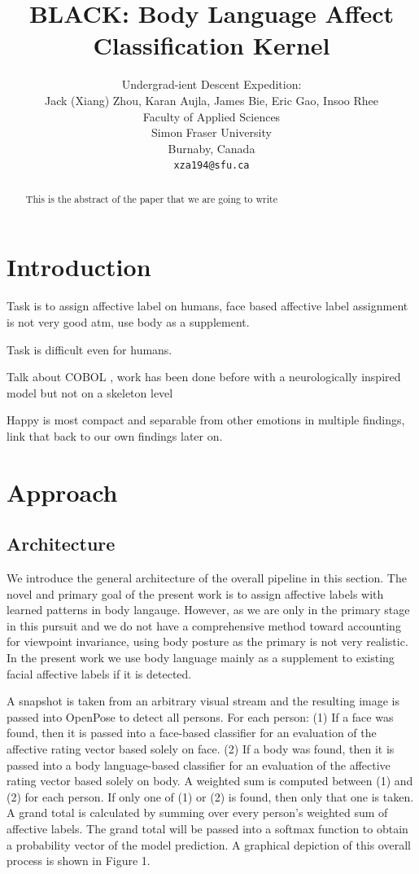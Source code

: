 \documentclass{article}
\title{BLACK: Body Language Affect Classification Kernel}
\author{
  Undergrad-ient Descent Expedition: \\
  Jack (Xiang) Zhou, Karan Aujla, James Bie, Eric Gao, Insoo Rhee\\
  Faculty of Applied Sciences\\
  Simon Fraser University\\
  Burnaby, Canada\\
  \texttt{xza194@sfu.ca} \\
}
\begin{document}
\maketitle

\begin{abstract}
  This is the abstract of the paper that we are going to write
\end{abstract}

\section{Introduction}



Task is to assign affective label on humans, face based affective label assignment is not very good atm, use body as a supplement.

Task is difficult even for humans. 

Talk about COBOL \citep{schindler2008recognizing}, work has been done before with a neurologically inspired model but not on a skeleton level

Happy is most compact and separable from other emotions in multiple findings, link that back to our own findings later on.

\section{Approach}
\subsection{Architecture}

We introduce the general architecture of the overall pipeline in this section. The novel and primary goal of the present work is to assign affective labels with learned patterns in body langauge. However, as we are only in the primary stage in this pursuit and we do not have a comprehensive method toward accounting for viewpoint invariance, using body posture as the primary is not very realistic. In the present work we use body language mainly as a supplement to existing facial affective labels if it is detected.

A snapshot is taken from an arbitrary visual stream and the resulting image is passed into OpenPose to detect all persons. For each person: (1) If a face was found, then it is passed into a face-based classifier for an evaluation of the affective rating vector based solely on face. (2) If a body was found, then it is passed into a body language-based classifier for an evaluation of the affective rating vector based solely on body. A weighted sum is computed between (1) and (2) for each person. If only one of (1) or (2) is found, then only that one is taken. A grand total is calculated by summing over every person's weighted sum of affective labels. The grand total will be passed into a softmax function to obtain a probability vector of the model prediction. A graphical depiction of this overall process is shown in Figure 1.
\end{document}

